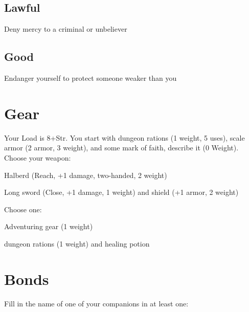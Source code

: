         
\subsection{Lawful}   
         

Deny mercy to a criminal or unbeliever

         
\subsection{Good}   
         

Endanger yourself to protect someone weaker than you

       

       
\section{Gear}   
       

         

Your Load is 8+Str. You start with dungeon rations (1 weight, 5 uses), scale armor (2 armor, 3 weight), and some mark of faith, describe it (0 Weight). Choose your weapon:

         
\startitemize[1,packed]
           
\item Halberd (Reach, +1 damage, two-handed, 2 weight)

           
\item Long sword (Close, +1 damage, 1 weight) and shield (+1 armor, 2 weight)

         
\stopitemize
         

Choose one:

         
\startitemize[1,packed]
           
\item Adventuring gear (1 weight)

           
\item dungeon rations (1 weight) and healing potion

         
\stopitemize
       

       
\section{Bonds}   
       

         

Fill in the name of one of your companions in at least one:

